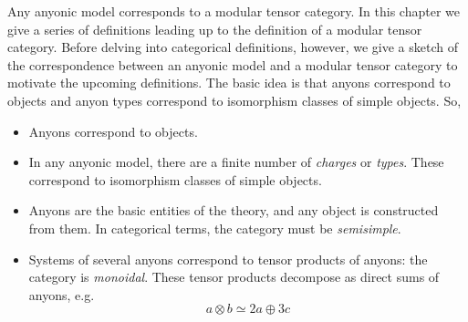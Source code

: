 Any anyonic model corresponds to a modular tensor category. In this chapter we
give a series of definitions leading up to the definition of a modular tensor
category. Before delving into categorical definitions, however, we give a
sketch of the correspondence between an anyonic model and a modular tensor
category to motivate the upcoming definitions. The basic idea is that anyons
correspond to objects and anyon types correspond to isomorphism classes of
simple objects. So,

\begin{itemize}
\item Anyons correspond to objects.
\item In any anyonic model, there are a finite number of \emph{charges} or
      \emph{types}. These correspond to isomorphism classes of simple objects.
\item Anyons are the basic entities of the theory, and any object is
constructed from them. In categorical terms, the category must be
\emph{semisimple}.
\item Systems of several anyons correspond to tensor products of anyons: the
      category is \emph{monoidal}. These tensor products decompose as direct sums of
      anyons, e.g. 
\begin{equation}
a \otimes b \simeq 2a \oplus 3c
\end{equation}


\end{itemize}
